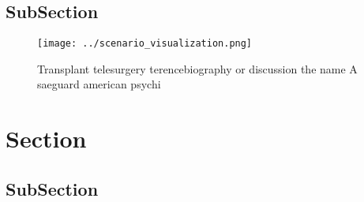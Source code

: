 \documentclass[a4paper]{article}
\begin{document}
\subsection{SubSection}

\begin{figure}
\centering
\texttt{[image: ../scenario\_visualization.png]}
\caption{Transplant telesurgery terencebiography or discussion the name A saeguard american psychi
}
\end{figure}
 
\section{Section}

\subsection{SubSection}
\end{document}
